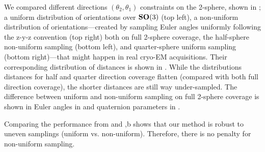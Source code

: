 We compared different directions $(\theta_2, \theta_1)$ constraints on the 2-sphere, shown in ; a uniform distribution of orientations over $\mathrm{\mathbf{SO}}(3)$ (top left), a non-uniform distribution of orientations---created by sampling Euler angles uniformly following the z-y-z convention (top right) both on full 2-sphere coverage, the half-sphere non-uniform sampling (bottom left), and quarter-sphere uniform sampling (bottom right)---that might happen in real cryo-EM acquisitions. 
Their corresponding distribution of distances is shown in .
While the distributions distances for half and quarter direction coverage flatten (compared with both full direction coverage), the shorter distances are still way under-sampled.
The difference between uniform and non-uniform sampling on full 2-sphere coverage is shown in Euler angles in  and quaternion parameters in .

Comparing the performance from  and ,b shows that our method is robust to uneven samplings (uniform vs. non-uniform). Therefore, there is no penalty for non-uniform sampling.


